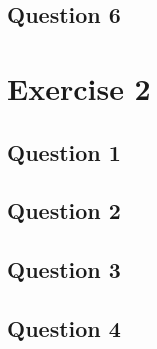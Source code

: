 \documentclass[10pt,a4paper]{article}
\begin{document}
\subsection{Question 6}

\section{Exercise 2}
\subsection{Question 1}
\subsection{Question 2}
\subsection{Question 3}
\subsection{Question 4}
\end{document}

